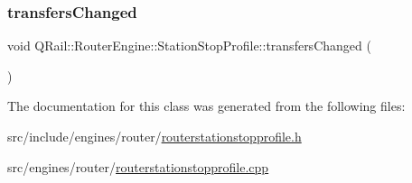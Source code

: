 \subsubsection{\texorpdfstring{transfersChanged}{transfersChanged}}
{\footnotesize\ttfamily void Q\+Rail\+::\+Router\+Engine\+::\+Station\+Stop\+Profile\+::transfers\+Changed (\begin{DoxyParamCaption}{ }\end{DoxyParamCaption})\hspace{0.3cm}{\ttfamily [signal]}}



The documentation for this class was generated from the following files\+:\begin{DoxyCompactItemize}
\item 
src/include/engines/router/\mbox{\hyperlink{routerstationstopprofile_8h}{routerstationstopprofile.\+h}}\item 
src/engines/router/\mbox{\hyperlink{routerstationstopprofile_8cpp}{routerstationstopprofile.\+cpp}}\end{DoxyCompactItemize}
